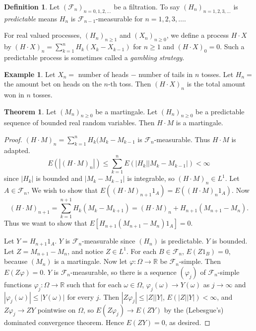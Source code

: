 \documentclass{article}
\newcommand{\R}{\mathbb{R}}
\newcommand{\F}{\mathscr{F}}
\theoremstyle{definition}
\newtheorem{theorem}{Theorem}
\newtheorem*{example}{Example}
\newtheorem*{definition}{Definition}
\begin{document}
\begin{definition}
Let $(\F_n)_{n=0, 1, 2, \dots}$ be a filtration. To say $(H_n)_{n = 1, 2, 3, \dots}$ is \emph{predictable} means $H_n$ is $\F_{n-1}$-measurable for $n = 1, 2, 3, \dots$.

For real valued processes, $(H_n)_{n \geq 1}$ and $(X_n)_{n \geq 0}$, we define a process $H \cdot X$ by $(H \cdot X)_n = \sum_{k=1}^n H_k(X_k - X_{k-1})$ for $n \geq 1$ and $(H \cdot X)_0 = 0$. Such a predictable process is sometimes called a \emph{gambling strategy}.
\end{definition}

\begin{example}
Let $X_n =$ number of heads $-$ number of tails in $n$ tosses. Let $H_n =$ the amount bet on heads on the $n$-th toss. Then $(H \cdot X)_n$ is the total amount won in $n$ tosses. 
\end{example}

\begin{theorem}
    Let $(M_n)_{n \geq 0}$ be a martingale. Let $(H_n)_{n \geq 0}$ be a predictable sequence of bounded real random variables. Then $H \cdot M$ is a martingale.
\end{theorem}
\begin{proof}
    $(H \cdot M)_n = \sum_{k=1}^n H_k(M_k - M_{k-1}$ is $\F_n$-measurable. Thus $H \cdot M$ is adapted.
    \[
        E(|(H \cdot M)_n|) \leq \sum_{k=1}^n E(|H_k||M_k - M_{k-1}|) < \infty
    \]
    since $|H_k|$ is bounded and $|M_k - M_{k-1}|$ is integrable, so $(H \cdot M)_n \in L^1$. Let $A \in\F_n$, We wish to show that $E((H \cdot M)_{n+1} 1_A) = E((H \cdot M)_n 1_A)$. Now
    \[
        (H \cdot M)_{n+1} = \sum_{k=1}^{n+1} H_k(M_k - M_{k+1}) = (H \cdot M)_n + H_{n+1}(M_{n+1} - M_n).
    \]
    Thus we want to show that $E[H_{n+1}(M_{n+1} - M_n) 1_A] = 0$.
    
    Let $Y = H_{n+1}1_A$. $Y$ is $\F_n$-measurable since $(H_n)$ is predictable. $Y$ is bounded. Let $Z = M_{n+1} - M_n$, and notice $Z \in L^1$. For each $B \in \F_n$, $E(Z1_B) = 0$, because $(M_n)$ is a martingale. Now let $\varphi : \Omega \to \R$ be $\F_n$-simple. Then $E(Z\varphi) = 0$. $Y$ is $\F_n$-measurable, so there is a sequence $(\varphi_j)$ of $\F_n$-simple functions $\varphi_j : \Omega \to \R$ such that for each $\omega \in \Omega$, $\varphi_j(\omega) \to Y(\omega)$ as $j \to \infty$ and $|\varphi_j(\omega)| \leq |Y(\omega)|$ for every $j$. Then $|Z\varphi_j| \leq |Z||Y|$, $E(|Z||Y|) < \infty$, and $Z\varphi_j \to ZY$ pointwise on $\Omega$, so $E(Z\varphi_j) \to E(ZY)$ by the (Lebesgue's) dominated convergence theorem. Hence $E(ZY) = 0$, as desired.
\end{proof}
\end{document}
